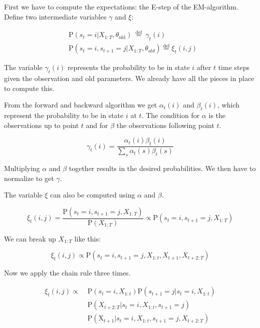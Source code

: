 First we have to compute the expectations: the E-step of the EM-algorithm. Define two intermediate variables $\gamma$ and $\xi$: 

\begin{equation}
  \begin{aligned}
&\mathrm{P}\left(s_{t}=i | X_{1: T}, \theta_{\text {old}}\right) \stackrel{\text { def }}{=} \gamma_{t}(i)\\
&\mathrm{P}\left(s_{t}=i, s_{t+1}=j | X_{1: T}, \theta_{o l d}\right) \stackrel{\mathrm{def}}{=} \xi_{t}(i, j)
\end{aligned} 
\end{equation}

The variable $\gamma_t(i)$ represents the probability to be in state $i$ after $t$ time steps given the observation and old parameters. We already have all the pieces in place to compute this.

From the forward and backward algorithm we get $\alpha_t(i)$ and $\beta_t(i)$, which represent the probability to be in state $i$ at $t$. The condition for $\alpha$ is the observations up to point $t$ and for $\beta$ the observations following point $t$.

\begin{equation}
   \gamma_t(i) = \frac{\alpha_{t}(i) \beta_{t}(i)}{\sum_{s} \alpha_{t}(s) \beta_{t}(s)}
\end{equation}

Multiplying $\alpha$ and $\beta$ together results in the desired probabilities. We then have to normalize to get $\gamma$. 

The variable $\xi$ can also be computed using $\alpha$ and $\beta$. 

\begin{equation}
   \xi_{t}(i, j)=\frac{\mathrm{P}\left(s_{t}=i, s_{t+1}=j, X_{1: T}\right)}{\mathrm{P}\left(X_{1: T}\right)} \propto \mathrm{P}\left(s_{t}=i, s_{t+1}=j, X_{1: T}\right)
\end{equation}

We can break up $X_{1:T}$ like this:

\begin{equation}
   \xi_{t}(i, j) \propto \mathrm{P}\left(s_{t}=i, s_{t+1}=j, X_{1: t}, X_{t+1},X_{t+2:T}\right)
\end{equation}

Now we apply the chain rule three times.

\begin{equation}
  \begin{aligned}
\xi_{t}(i, j) \propto \;  &\mathrm{P}\left(s_{t}=i, X_{1: t}\right) \mathrm{P}\left(s_{t+1}=j | s_{t}=i, X_{1: t}\right) \\
&\mathrm{P}\left(X_{t+2: T} | s_{t}=i, X_{1: t}, s_{t+1}=j\right) \\
&\mathrm{P}\left(\mathrm{X}_{t+1} | s_{t}=i, X_{1: t}, s_{t+1}=j, X_{t+2: T}\right)
\end{aligned} 
\end{equation}

